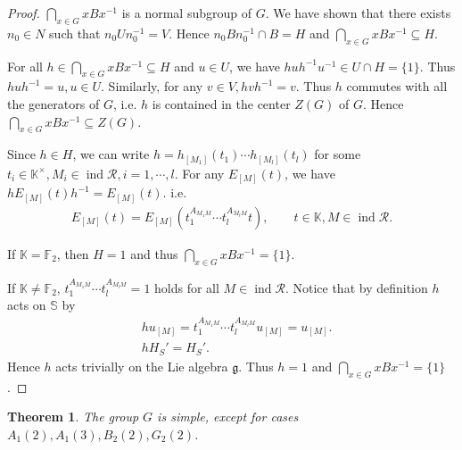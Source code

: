 \documentclass[12pt]{amsart}
\newtheorem{theorem}{Theorem}[section]
\begin{document}
\begin{proof}
    $\bigcap\limits_{x\in G} xBx^{-1}$ is a normal subgroup of $G$.
    We have shown that there exists $n_0 \in N$ such that $n_0 U n_0^{-1} = V$. 
    Hence $n_0 B n_0^{-1} \cap B = H$ and $\bigcap\limits_{x\in G} xBx^{-1} \subseteq  H$.
    
    For all $h\in \bigcap\limits_{x\in G} xBx^{-1} \subseteq  H$ and $u\in U$, we have $huh^{-1}u^{-1}\in U\cap H = \{1\}$. 
    Thus $huh^{-1} = u,  u\in U$.
    Similarly, for any $ v\in V,hvh^{-1} = v$.
    Thus $h$ commutes with all the generators of $G$, i.e. $h$ is contained in the center $Z(G)$ of $G$.
    Hence $\bigcap\limits_{x\in G} xBx^{-1} \subseteq  Z(G)$.
    
    Since $h\in H$, we can write $h=h_{[M_1]}(t_1)\cdots h_{[M_l]}(t_l)$ for some $t_i\in \mathbb{K}^{\times}, M_i \in \operatorname{ind}\mathcal{R}, i=1,\cdots , l$.
    For any $ E_{[M]}(t)$, we have $hE_{[M]}(t)h^{-1} = E_{[M]}(t)$.
    i.e.
    \begin{align*}
        E_{[M]}(t) = E_{[M]}(t_1^{A_{M_1M}}\cdots t_l^{A_{M_lM}}t), \qquad  t\in \mathbb{K}, M\in \operatorname{ind}\mathcal{R}.
    \end{align*}

    If $\mathbb{K}=\mathbb{F}_2$, then $H=1$ and thus $\bigcap\limits_{x\in G} xBx^{-1}=\{1\}$.

    If $\mathbb{K}\neq \mathbb{F}_2$, $t_1^{A_{M_1M}}\cdots t_l^{A_{M_lM}}=1$ holds for all $M \in \operatorname{ind}\mathcal{R}$.
    Notice that by definition $h$ acts on $\mathbb{S}$ by
    \begin{align*}
        &hu_{[M]}=t_1^{A_{M_1M}}\cdots t_l^{A_{M_lM}}u_{[M]} = u_{[M]}. \\
        &hH_S'=H_S'.
    \end{align*}
    Hence $h$ acts trivially on the Lie algebra $\mathfrak{g}$.
    Thus $h=1$ and $\bigcap\limits_{x\in G} xBx^{-1}=\{1\}$.
\end{proof}

\begin{theorem}
    The group $G$ is simple, except for cases $A_1(2),A_1(3),B_2(2),G_2(2)$.
\end{theorem}
\end{document}
